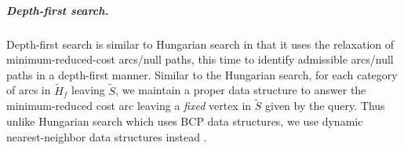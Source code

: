 \documentclass[a4paper,UKenglish]{socg-lipics-v2018}
\makeatletter
\def\note#1{\textcolor{red}{{#1}}}
\def\polylog{\mathop{\mathrm{polylog}}}
\theoremstyle{plain}
\numberwithin{figure}{section}
\renewcommand{\paragraph}{\subparagraph}
\def\n@te#1{\textsf{\boldmath \textbf{$\langle\!\langle$#1$\rangle\!\rangle$}}\leavevmode}
\def\note#1{\textcolor{red}{\n@te{#1}}}
\makeatother
\begin{document}
%


\paragraph{Depth-first search.}
Depth-first search is similar to Hungarian search in that it
uses the relaxation of minimum-reduced-cost arcs/null paths, this time to
identify admissible arcs/null paths in a depth-first manner.
%
Similar to the Hungarian search, for each category of arcs in $\tilde{H}_f$
leaving $\tilde{S}$, we maintain a proper data structure to answer the
minimum-reduced cost arc leaving a \emph{fixed} vertex in $\tilde{S}$ given
by the query.
Thus unlike Hungarian search which uses BCP data structures, we use dynamic
nearest-neighbor data structures instead \cite{KMRSS17}.
\end{document}
